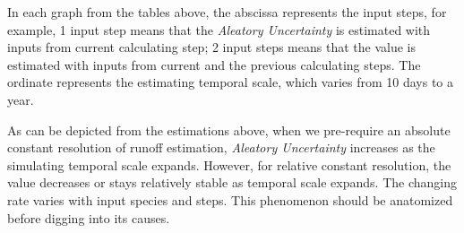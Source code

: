 In each graph from the tables above, the abscissa represents the input steps, for example, 1 input step  means that the \emph{Aleatory Uncertainty} is estimated with inputs from current calculating step; 2 input steps means that  the value is estimated with inputs from current and the previous calculating steps. The ordinate represents the estimating temporal scale, which varies from 10 days to a year. 

As can be depicted from the estimations above, when we pre-require an absolute constant resolution of runoff estimation, \emph{Aleatory Uncertainty} increases as the simulating temporal scale expands. However, for relative constant resolution, the value decreases or stays relatively stable as temporal scale expands. The changing rate varies with input species and steps.  This phenomenon should be anatomized before digging into its causes.
\fi
